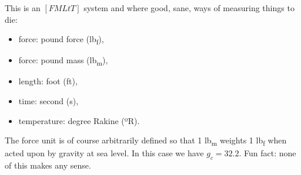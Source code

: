 This is an $[FMLtT]$ system and where good, sane, ways of measuring things to die:
\begin{itemize}
  \item force: pound force (\si{lb_f}),
  \item force: pound mass (\si{lb_m}),
  \item length: foot (ft),
  \item time: second (s),
  \item temperature: degree Rakine (ºR).
\end{itemize}

The force unit is of course arbitrarily defined so that 1 \si{lb_m} weights 1 \si{lb_f} when acted upon by gravity at sea level. In this case we have $g_c = 32.2 $. Fun fact: none of this makes any sense.
